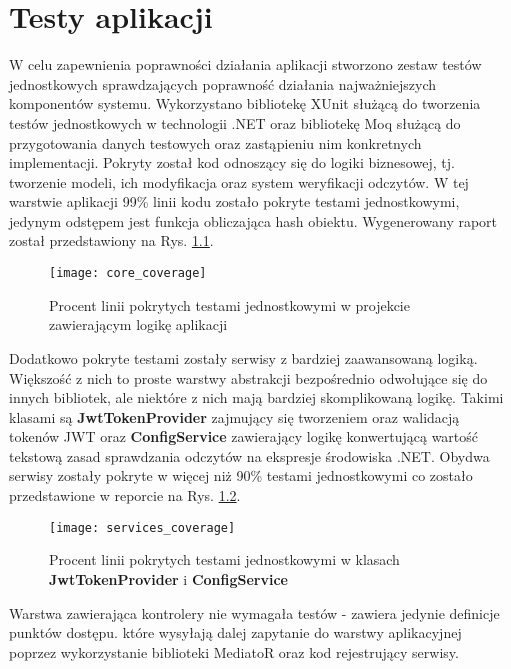 \chapter{Testy aplikacji}
W celu zapewnienia poprawności działania aplikacji stworzono zestaw testów jednostkowych
sprawdzających poprawność działania najważniejszych komponentów systemu. 
Wykorzystano bibliotekę XUnit służącą do tworzenia testów jednostkowych w technologii .NET
oraz bibliotekę Moq służącą do przygotowania danych testowych oraz zastąpieniu nim konkretnych implementacji.
Pokryty został kod odnoszący się do logiki biznesowej, tj. tworzenie modeli, ich modyfikacja
oraz system weryfikacji odczytów. W tej warstwie aplikacji 99\% linii kodu zostało pokryte
testami jednostkowymi, jedynym odstępem jest funkcja obliczająca hash obiektu.
Wygenerowany raport został przedstawiony na Rys. \ref{core:coverage}.
\begin{figure}[h!]
  \centering
  \texttt{[image: core\_coverage]}
  \caption{Procent linii pokrytych testami jednostkowymi w projekcie zawierającym logikę aplikacji}
  \label{core:coverage}
\end{figure}
Dodatkowo pokryte testami zostały serwisy z bardziej zaawansowaną logiką. Większość z nich to proste
warstwy abstrakcji bezpośrednio odwołujące się do innych bibliotek, ale niektóre z nich mają bardziej
skomplikowaną logikę. Takimi klasami są \textbf{JwtTokenProvider} zajmujący się tworzeniem oraz walidacją
tokenów JWT oraz \textbf{ConfigService} zawierający logikę konwertującą wartość tekstową zasad sprawdzania
odczytów na ekspresje środowiska .NET. Obydwa serwisy zostały pokryte w więcej niż 90\% testami jednostkowymi
co zostało przedstawione w reporcie na Rys. \ref{services:coverage}.
\begin{figure}[h!]
  \centering
  \texttt{[image: services\_coverage]}
  \caption{Procent linii pokrytych testami jednostkowymi w klasach \textbf{JwtTokenProvider} i \textbf{ConfigService}}
  \label{services:coverage}
\end{figure}
Warstwa zawierająca kontrolery nie wymagała testów - zawiera jedynie definicje punktów dostępu.
które wysyłają dalej zapytanie do warstwy aplikacyjnej poprzez wykorzystanie biblioteki MediatoR
oraz kod rejestrujący serwisy.

